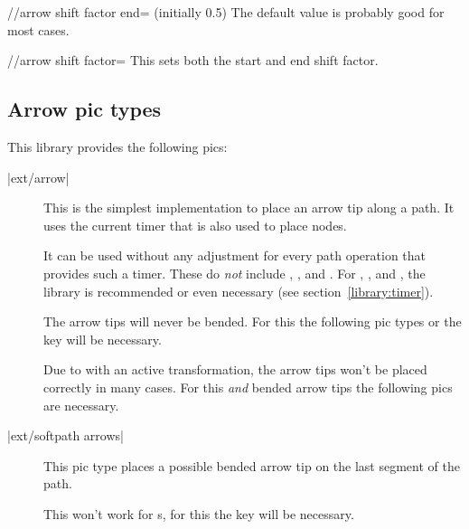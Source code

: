 \begin{multicols}{2}
\begin{key}{/\tikzext/arrow shift factor end= (initially 0.5)}
  The default value is probably good for most cases.
\end{key}
\begin{key}{/\tikzext/arrow shift factor=}
  This sets both the start and end shift factor.
\end{key}
\subsection{Arrow pic types}

This library provides the following pics:
\begin{description}
\item[|ext/arrow|]
  This is the simplest implementation to place an arrow tip along a path.
  It uses the current timer that is also used to place nodes.
  
  It can be used without any adjustment for every path operation that provides such a timer.
  These do \emph{not} include
  ,
  ,
   and
  .
  For ,
      ,
       and
      ,
  the  library is recommended or even necessary
  (see section~\ref{library:timer}).
  
  The arrow tips will never be bended. For this the following pic types
  or the  key will be necessary.

  Due to \cite{PgfIssueSloped} with an active transformation,
  the arrow tips won't be placed correctly in many cases.
  For this \emph{and} bended arrow tips the following pics are necessary.
  
\item[|ext/softpath arrows|]
  This pic type places a possible bended arrow tip on the last segment of the path.
  
  
  This won't work for s,
  for this the  key will be necessary.
  

\end{description}
\end{multicols}

